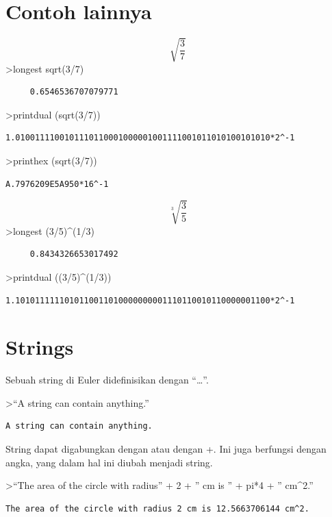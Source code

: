 \documentclass[
]{book}
\begin{document}
\section{Contoh lainnya}\label{contoh-lainnya-2}

\[\sqrt{\frac{3}{7}}\]\textgreater longest sqrt(3/7)

\begin{verbatim}
     0.6546536707079771 
\end{verbatim}

\textgreater printdual (sqrt(3/7))

\begin{verbatim}
1.0100111100101110110001000001001111001011010100101010*2^-1
\end{verbatim}

\textgreater printhex (sqrt(3/7))

\begin{verbatim}
A.7976209E5A950*16^-1
\end{verbatim}

\[\sqrt[3]{\frac{3}{5}}\]\textgreater longest (3/5)\^{}(1/3)

\begin{verbatim}
     0.8434326653017492 
\end{verbatim}

\textgreater printdual ((3/5)\^{}(1/3))

\begin{verbatim}
1.1010111111010110011010000000001110110010110000001100*2^-1
\end{verbatim}

\section{Strings}\label{strings}

Sebuah string di Euler didefinisikan dengan ``\ldots{}''.

\textgreater{}``A string can contain anything.''

\begin{verbatim}
A string can contain anything.
\end{verbatim}

String dapat digabungkan dengan \textbar{} atau dengan +. Ini juga berfungsi dengan angka, yang dalam hal ini diubah menjadi string.

\textgreater{}``The area of the circle with radius'' + 2 + '' cm is '' + pi*4 + '' cm\^{}2.''

\begin{verbatim}
The area of the circle with radius 2 cm is 12.5663706144 cm^2.
\end{verbatim}
\end{document}
